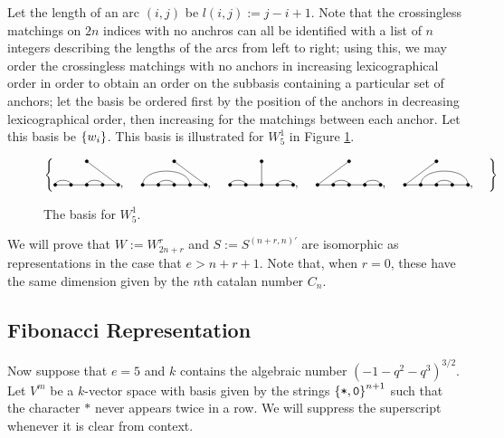 \documentclass{amsart}
\begin{document}
Let the length of an arc $(i,j)$ be $l(i,j) := j - i + 1$.
Note that the crossingless matchings on $2n$ indices with no anchros can all be identified with a list of $n$ integers describing the lengths of the arcs from left to right;
using this, we may order the crossingless matchings with no anchors in increasing lexicographical order in order to obtain an order on the subbasis containing a particular set of anchors;
let the basis be ordered first by the position of the anchors in decreasing lexicographical order, then increasing for the matchings between each anchor.
Let this basis be $\left\{ w_i \right\}$.
This basis is illustrated for $W_{5}^1$ in Figure \ref{S5 Basis}. 

\begin{figure} 
  \def\cbasisspacing{5mm}
  $\cbr{
    \begin{gathered}
      \GeneralizedMatching{5}{1/2, 3/4}{1}{5/1}{3/4}, \hspace{\cbasisspacing}
      \GeneralizedMatching{5}{1/4, 2/3}{1}{5/1}{3/4}, \hspace{\cbasisspacing}
      \GeneralizedMatching{5}{1/2, 4/5}{1}{3/1}{3/4}, \hspace{\cbasisspacing}
      \GeneralizedMatching{5}{2/3, 4/5}{1}{1/1}{3/4}, \hspace{\cbasisspacing}
      \GeneralizedMatching{5}{2/5, 3/4}{1}{1/1}{3/4}, \hspace{\cbasisspacing}
     \end{gathered}}$ 
    \caption{The basis for $W_5^1$.}
  \label{S5 Basis}
\end{figure} 

We will prove that $W := W_{2n+r}^r$ and $S := S^{(n+r,n)'}$ are isomorphic as representations in the case that $e > n + r + 1$.
Note that, when $r = 0$, these have the same dimension given by the $n$th catalan number $C_n$.
 
\subsection{Fibonacci Representation}
\def\vara{\alpha}
\def\varb{\beta}
\def\varc{\gamma}
\def\vard{\delta}
\def\vare{\varepsilon}
\def\vs{\texttt{*}}
\def\vp{\texttt{0}}
Now suppose that $e = 5$ and $k$ contains the algebraic number $(-1 - q^2 - q^3)^{3/2}$.
Let $V^m$ be a $k$-vector space with basis given by the strings $\cbr{\vs,\vp}^{n+1}$ such that the character $\vs$ never appears twice in a row. 
We will suppress the superscript whenever it is clear from context.
\end{document}
